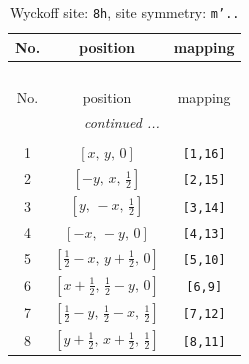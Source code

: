 \documentclass[fleqn,8pt]{jsarticle}
\begin{document}
\begin{longtable}{ccc}
\caption{Wyckoff site: {\tt 8h}, site symmetry: {\tt m'..}}
 \\
 \hline \hline
No. & position & mapping \\ \hline \endfirsthead

\multicolumn{2}{l}{\tablename\ \thetable{}} \\
 \hline \hline
No. & position & mapping \\ \hline \endhead

 \hline \hline
\multicolumn{2}{r}{\footnotesize\it continued ...} \\ \endfoot

 \hline \hline
\multicolumn{2}{r}{} \\ \endlastfoot

1 & $\left[ x,\, y,\, 0 \right]$ & {\tt [1,16]} \\ \hline
2 & $\left[ - y,\, x,\, \frac{1}{2} \right]$ & {\tt [2,15]} \\ \hline
3 & $\left[ y,\, - x,\, \frac{1}{2} \right]$ & {\tt [3,14]} \\ \hline
4 & $\left[ - x,\, - y,\, 0 \right]$ & {\tt [4,13]} \\ \hline
5 & $\left[ \frac{1}{2} - x,\, y + \frac{1}{2},\, 0 \right]$ & {\tt [5,10]} \\ \hline
6 & $\left[ x + \frac{1}{2},\, \frac{1}{2} - y,\, 0 \right]$ & {\tt [6,9]} \\ \hline
7 & $\left[ \frac{1}{2} - y,\, \frac{1}{2} - x,\, \frac{1}{2} \right]$ & {\tt [7,12]} \\ \hline
8 & $\left[ y + \frac{1}{2},\, x + \frac{1}{2},\, \frac{1}{2} \right]$ & {\tt [8,11]} \\
\end{longtable}
\renewcommand{\arraystretch}{1.2}
\end{document}
